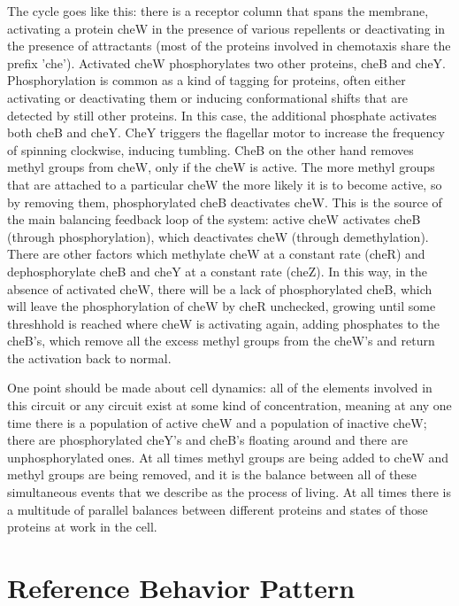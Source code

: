\documentclass[12pt]{article}
\begin{document}
The cycle goes like this: there is a receptor column that spans the membrane, activating a protein cheW in the presence of various repellents or deactivating in the presence of attractants (most of the proteins involved in chemotaxis share the prefix 'che').  Activated cheW phosphorylates two other proteins, cheB and cheY.  Phosphorylation is common as a kind of tagging for proteins, often either activating or deactivating them or inducing conformational shifts that are detected by still other proteins.  In this case, the additional phosphate activates both cheB and cheY.  CheY triggers the flagellar motor to increase the frequency of spinning clockwise, inducing tumbling.  CheB on the other hand removes methyl groups from cheW, only if the cheW is active.  The more methyl groups that are attached to a particular cheW the more likely it is to become active, so by removing them, phosphorylated cheB deactivates cheW.  This is the source of the main balancing feedback loop of the system:  active cheW activates cheB (through phosphorylation), which deactivates cheW (through demethylation).  There are other factors which methylate cheW at a constant rate (cheR) and dephosphorylate cheB and cheY at a constant rate (cheZ).  In this way, in the absence of activated cheW, there will be a lack of phosphorylated cheB, which will leave the phosphorylation of cheW by cheR unchecked, growing until some threshhold is reached where cheW is activating again, adding phosphates to the cheB's, which remove all the excess methyl groups from the cheW's and return the activation back to normal.  

One point should be made about cell dynamics: all of the elements involved in this circuit or any circuit exist at some kind of concentration, meaning at any one time there is a population of active cheW and a population of inactive cheW; there are phosphorylated cheY's and cheB's floating around and there are unphosphorylated ones.  At all times methyl groups are being added to cheW and methyl groups are being removed, and it is the balance between all of these simultaneous events that we describe as the process of living.  At all times there is a multitude of parallel balances between different proteins and states of those proteins at work in the cell.  

\section{Reference Behavior Pattern}
\end{document}

